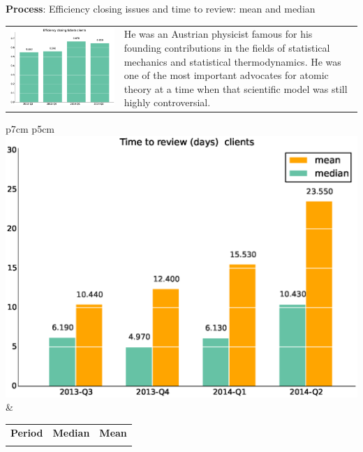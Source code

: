 \documentclass[a4wide,11pt]{report}
\begin{document}
\textbf{Process}: Efficiency closing issues and time to review: mean and median

\begin{tabular}{p{7cm} p{5cm}}
    \vspace{0pt} 
    \includegraphics[scale=.35]{figs/bmiclients.eps}
    & 
    \vspace{0pt}
    He was an Austrian physicist famous for his founding contributions in the fields of
    statistical mechanics and statistical thermodynamics. He was one of the most
    important advocates for atomic theory at a time when that scientific model was 
    still highly controversial.\\
\end{tabular}

\begin{tabular}{p{7cm} p{5cm}}
    \vspace{0pt} 
    \includegraphics[scale=.35]{figs/timetoreview_medianclients.eps}
    & 
    \vspace{0pt}
    \begin{tabular}{l|r|r|}%
    \bfseries Period & \bfseries Median & \bfseries Mean %
    \csvreader[head to column names]{data/timetoreview_medianclients.csv}{}%
    {\\ & \mediantime & \meantime}
    \end{tabular}
\end{tabular}
\end{document}
